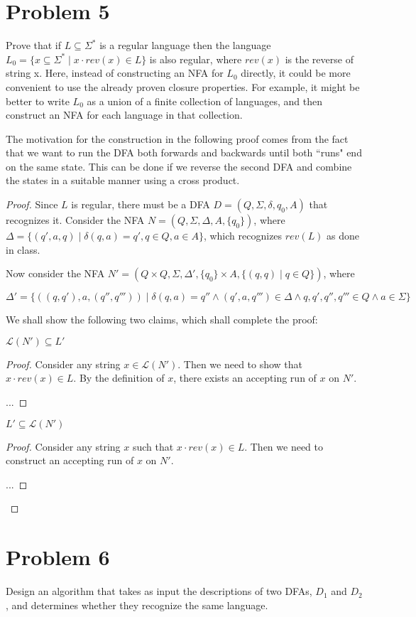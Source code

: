 \documentclass[a4paper]{article}
\newcommand{\mc}{\mathcal}
\begin{document}
\section{Problem 5}
Prove that if $L \subseteq \Sigma^*$ is a regular language then the language $L_0 = \{x \subseteq \Sigma^* \mid x \cdot rev(x) \in L\}$ is also
regular, where $rev(x)$ is the reverse of string x. Here, instead of constructing an NFA for $L_0$ directly, it
could be more convenient to use the already proven closure properties. For example, it might be better
to write $L_0$ as a union of a finite collection of languages, and then construct an NFA for each language
in that collection.

\begin{note}
    The motivation for the construction in the following proof comes from the fact that we want to run the DFA both forwards and backwards until both ``runs" end on the same state. This can be
    done if we reverse the second DFA and combine the states in a suitable manner using a cross product.
\end{note}

\begin{proof}

    Since $L$ is regular, there must be a DFA $D = (Q, \Sigma, \delta, q_0, A)$ that recognizes it. Consider the NFA $N = (Q, \Sigma, \Delta, A, \{q_0\})$, where $\Delta = \{(q', a, q) \mid \delta(q,
    a) = q', q \in Q, a \in A\}$, which recognizes $rev(L)$ as done in class.

    Now consider the NFA $N' = (Q \times Q, \Sigma, \Delta', \{q_0\} \times A, \{(q, q) \mid q \in Q\})$, where 

    $$\Delta' = \{((q, q'), a, (q'', q''')) \mid \delta(q, a) = q'' \land
    (q', a, q''') \in \Delta \land q, q', q'', q''' \in Q \land a \in \Sigma\}$$

    We shall show the following two claims, which shall complete the proof:\\

    \begin{claim}
        $\mc{L}(N') \subseteq L'$
    \end{claim}

    \begin{proof}
        Consider any string $x \in \mc{L}(N')$. Then we need to show that $x \cdot rev(x) \in L$. By the definition of $x$, there exists an accepting run of $x$ on $N'$. 


        ...
    \end{proof}

    \begin{claim}
        $L' \subseteq \mc{L}(N')$
    \end{claim}

    \begin{proof}
        Consider any string $x$ such that $x \cdot rev(x) \in L$. Then we need to construct an accepting run of $x$ on $N'$.

        ...
    \end{proof}

\end{proof}

\section{Problem 6}
Design an algorithm that takes as input the descriptions of two DFAs, $D_1$ and $D_2$, and determines
whether they recognize the same language.
\end{document}
